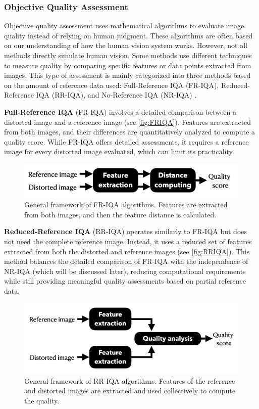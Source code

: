 \subsubsection{Objective Quality Assessment}
\label{subsub:ObjectiveQualityAssessment}
Objective quality assessment uses mathematical algorithms to evaluate image quality instead of relying on human judgment. These algorithms are often based on our understanding of how the human vision system works. However, not all methods directly simulate human vision. Some methods use different techniques to measure quality by comparing specific features or data points extracted from images. This type of assessment is mainly categorized into three methods based on the amount of reference data used: Full-Reference IQA (FR-IQA), Reduced-Reference IQA (RR-IQA), and No-Reference IQA (NR-IQA) \autocite{D}. \par
\vspace{\baselineskip}
\noindent
\textbf{Full-Reference IQA} (FR-IQA) involves a detailed comparison between a distorted image and a reference image (see \autoref{fig:FRIQA}). Features are extracted from both images, and their differences are quantitatively analyzed to compute a quality score. While FR-IQA offers detailed assessments, it requires a reference image for every distorted image evaluated, which can limit its practicality. \par
\clearpage
\begin{figure}[ht]
    \centering
    \includegraphics[keepaspectratio,width=12cm]{img/FRIQA.jpg}
    \caption{General framework of FR-IQA algorithms. Features are extracted from both images, and then the feature distance is calculated.}
    \label{fig:FRIQA}
\end{figure}
\noindent
\textbf{Reduced-Reference IQA} (RR-IQA) operates similarly to FR-IQA but does not need the complete reference image. Instead, it uses a reduced set of features extracted from both the distorted and reference images (see \autoref{fig:RRIQA}). This method balances the detailed comparison of FR-IQA with the independence of NR-IQA (which will be discussed later), reducing computational requirements while still providing meaningful quality assessments based on partial reference data. \par
\begin{figure}[ht]
    \centering
    \includegraphics[keepaspectratio,width=12cm]{img/RRIQA.jpg}
    \caption{General framework of RR-IQA algorithms. Features of the reference and distorted images are extracted and used collectively to compute the quality.}
    \label{fig:RRIQA}
\end{figure}
